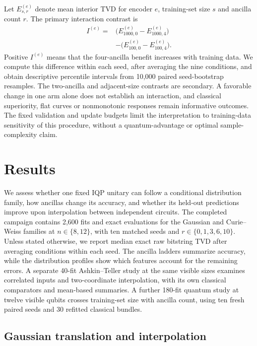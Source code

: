 \documentclass[pra,aps,10pt,twocolumn,floatfix,superscriptaddress,
notitlepage,longbibliography]{revtex4-2}
\begin{document}
Let $E_{s,r}^{(e)}$ denote mean interior TVD for encoder $e$, training-set size $s$ and ancilla count $r$. The primary interaction contrast is
\begin{equation}
\begin{aligned}
 I^{(e)}={}&\bigl(E_{1000,0}^{(e)}-E_{1000,4}^{(e)}\bigr)\\
           &-\bigl(E_{100,0}^{(e)}-E_{100,4}^{(e)}\bigr).
\end{aligned}
\label{eq:data-ancilla-interaction}
\end{equation}
Positive $I^{(e)}$ means that the four-ancilla benefit increases with training data. We compute this difference within each seed, after averaging the nine conditions, and obtain descriptive percentile intervals from 10,000 paired seed-bootstrap resamples. The two-ancilla and adjacent-size contrasts are secondary. A favorable change in one arm alone does not establish an interaction, and classical superiority, flat curves or nonmonotonic responses remain informative outcomes. The fixed validation and update budgets limit the interpretation to training-data sensitivity of this procedure, without a quantum-advantage or optimal sample-complexity claim.

\section{Results}

We assess whether one fixed IQP unitary can follow a conditional distribution family, how ancillas change its accuracy, and whether its held-out predictions improve upon interpolation between independent circuits. The completed campaign contains 2,600 fits and exact evaluations for the Gaussian and Curie--Weiss families at $n\in\{8,12\}$, with ten matched seeds and $r\in\{0,1,3,6,10\}$. Unless stated otherwise, we report median exact raw bitstring TVD after averaging conditions within each seed. The ancilla ladders summarize accuracy, while the distribution profiles show which features account for the remaining errors. A separate 40-fit Ashkin--Teller study at the same visible sizes examines correlated inputs and two-coordinate interpolation, with its own classical comparators and mean-based summaries. A further 180-fit quantum study at twelve visible qubits crosses training-set size with ancilla count, using ten fresh paired seeds and 30 refitted classical bundles.

\subsection{Gaussian translation and interpolation}
\end{document}
